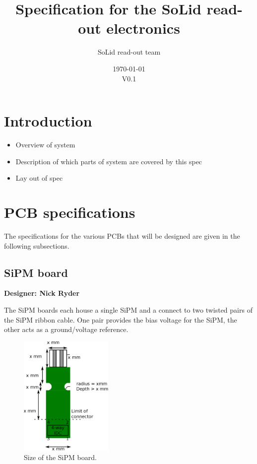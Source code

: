 \documentclass[a4paper]{article}
\title{Specification for the SoLid read-out electronics}
\author[]{SoLid read-out team}
\date{\today\\V0.1}
\begin{document}
\maketitle

\tableofcontents

\section{Introduction}

\begin{itemize}
    \item Overview of system
    \item Description of which parts of system are covered by this spec
    \item Lay out of spec
\end{itemize}

\section{PCB specifications}

The specifications for the various PCBs that will be designed are given in the following subsections.

\clearpage
\newpage
\subsection{SiPM board}

{\bf Designer: Nick Ryder}

The SiPM boards each house a single SiPM and a connect to two twisted pairs of the SiPM ribbon cable.
One pair provides the bias voltage for the SiPM, the other acts as a ground/voltage reference.

\begin{figure}[h]
    \begin{center}
        \includegraphics[width=0.4\textwidth]{imgs/sipmboardsize}
        \caption{Size of the SiPM board.}
        \label{fig:sipmboardsize}
    \end{center}
\end{figure}
\end{document}
